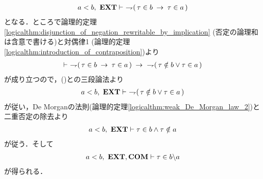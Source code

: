 \begin{prf}
\begin{description}
				\begin{align}
					a < b,\ \mbox{{\bf EXT}} \vdash\ \rightharpoondown\hspace{-0.25em} (\, \tau \in b \hspace{0.25em}\rightarrow\hspace{0.25em} \tau \in a\, )
					\label{fom:element_and_proper_subset_correspond_7}
				\end{align}
				となる．ところで論理的定理\ref{logicalthm:disjunction_of_negation_rewritable_by_implication}
				(否定の論理和は含意で書ける)と対偶律1 (論理的定理\ref{logicalthm:introduction_of_contraposition})より
				\begin{align}
					\vdash\ \negation (\, \tau \in b \rarrow \tau \in a\, ) \rarrow\ 
					\negation (\, \tau \notin b \vee \tau \in a\, )
				\end{align}
				が成り立つので，()との三段論法より
				\begin{align}
					a < b,\ \mbox{{\bf EXT}} \vdash\ \rightharpoondown\hspace{-0.25em} (\, \tau \notin b \vee \tau \in a\, )
				\end{align}
				が従い，De Morganの法則(論理的定理\ref{logicalthm:weak_De_Morgan_law_2})と二重否定の除去より
				\begin{align}
					a < b,\ \mbox{{\bf EXT}} \vdash \tau \in b \wedge \tau \notin a
				\end{align}
				が従う．そして
				\begin{align}
					a < b,\ \mbox{{\bf EXT}},\mbox{\bf COM} \vdash \tau \in b \backslash a
					\label{fom:element_and_proper_subset_correspond_5}
				\end{align}
				が得られる．
				

\end{description}
\end{prf}

